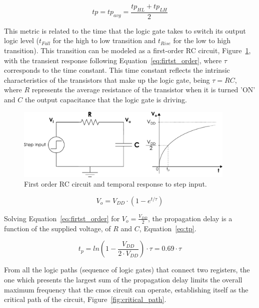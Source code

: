 \begin{equation}
    tp = tp_{avg} = \frac{tp_{HL}+tp_{LH}}{2}
    \label{eq:tp_avg}
\end{equation}

This metric is related to the time that the logic gate takes to switch its output logic level ($t_{Fall}$ for the high to low transition and $t_{Rise}$ for the low to high transition). This transition can be modeled as a first-order RC circuit, Figure~\ref{fig:rc_circuit}, with the transient response following Equation~\ref{eq:firtst_order}, where $\tau$ corresponds to the time constant. This time constant reflects the intrinsic characteristics of the transistors that make up the logic gate, being $\tau=RC$, where $R$ represents the average resistance of the transistor when it is turned 'ON' and $C$ the output capacitance that the logic gate is driving.


\begin{figure}[htb]
    \centering
    \includegraphics[width=105mm]{Figures/Background/rc_circuit.pdf}
    \caption{First order RC circuit and temporal response to step input.}
    \label{fig:rc_circuit}
\end{figure}

\begin{equation}
    V_o=V_{DD} \cdot (1-e^{t/\tau})
    \label{eq:firtst_order}
\end{equation}

Solving Equation~\ref{eq:firtst_order} for $V_o=\frac{V_{DD}}{2}$, the propagation delay is a function of the supplied voltage, of $R$ and $C$, Equation~\ref{eq:tp}.


\begin{equation}
    t_p=ln(1-\frac{V_{DD}}{2 \cdot V_{DD}})\cdot\tau=0.69\cdot\tau
    \label{eq:tp}
\end{equation}


From all the logic paths (sequence of logic gates) that connect two registers, the one which presents the largest sum of the propagation delay limits the overall maximum frequency that the \acrshort{cmos} circuit can operate, establishing itself as the critical path of the circuit, Figure~\ref{fig:critical_path}.

